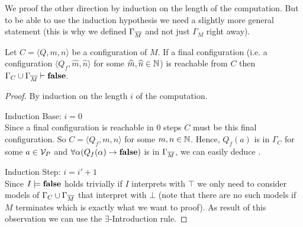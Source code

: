 We proof the other direction by induction on the length of the computation. But to be able to use the induction hypothesis we need a slightly more general statement (this is why we defined $\Gamma_{\overline{M}}$ and not just $\Gamma_M$ right away).
\begin{lemma}\label{cla.3.6}
	Let $C=\langle Q,m,n\rangle$ be a configuration of $M$. If a final configuration (i.e. a configuration $\langle Q_f,\widehat{m},\widehat{n}\rangle$ for some $\widehat{m},\widehat{n}\in\mathbb{N}$) is reachable from $C$ then $\Gamma_C\cup\Gamma_{\overline{M}}\vdash\textbf{false}$.
\end{lemma}
\begin{proof} By induction on the length $i$ of the computation.
	
	Induction Base: $i=0$\\
	Since a final configuration is reachable in 0 steps $C$ must be this final configuration. So $C=\langle Q_f,m,n\rangle$ for some $m,n\in\mathbb{N}$. Hence, $Q_f(a)$ is in $\Gamma_C$ for some $a\in\mathcal{V}_P$ and $\forall\alpha(Q_f(\alpha)\to\textbf{false})$ is in $\Gamma_{\overline{M}}$, we can easily deduce \false.
	\begin{figure}[H]
		\centering
		
	\end{figure}
	 
	Induction Step: $i= i'+1$\\
	Since $I\models\textbf{false}$ holds trivially if $I$ interprets \false{} with $\top$ we only need to consider models of $\Gamma_C\cup\Gamma_{\overline{M}}$ that interpret \false{} with $\bot$ (note that there are no such models if $M$ terminates which is exactly what we want to proof). As result of this observation we can use the $\exists$-Introduction rule.
	

\end{proof}
